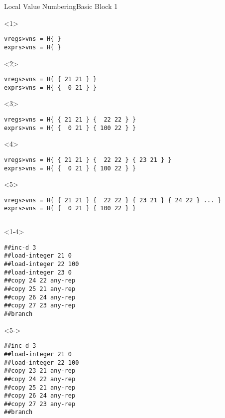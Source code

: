 \documentclass{beamer}
\begin{document}
\begin{frame}[fragile]{Local Value Numbering}{Basic Block 1}
  \begin{onlyenv}<1>
  \begin{Verbatim}
vregs>vns = H{ }
exprs>vns = H{ }
  \end{Verbatim}
  \end{onlyenv}
  \begin{onlyenv}<2>
  \begin{Verbatim}
vregs>vns = H{ { 21 21 } }
exprs>vns = H{ {  0 21 } }
  \end{Verbatim}
  \end{onlyenv}
  \begin{onlyenv}<3>
  \begin{Verbatim}
vregs>vns = H{ { 21 21 } {  22 22 } }
exprs>vns = H{ {  0 21 } { 100 22 } }
  \end{Verbatim}
  \end{onlyenv}
  \begin{onlyenv}<4>
  \begin{Verbatim}
vregs>vns = H{ { 21 21 } {  22 22 } { 23 21 } }
exprs>vns = H{ {  0 21 } { 100 22 } }
  \end{Verbatim}
  \end{onlyenv}
  \begin{onlyenv}<5>
  \begin{Verbatim}
vregs>vns = H{ { 21 21 } {  22 22 } { 23 21 } { 24 22 } ... }
exprs>vns = H{ {  0 21 } { 100 22 } }
  \end{Verbatim}
  \end{onlyenv}
  \begin{columns}[t,onlytextwidth]
    \begin{column}[t]{.45\textwidth}
      \begin{onlyenv}<1-4>
      \begin{Verbatim}[frame=single]
##inc-d 3
##load-integer 21 0
##load-integer 22 100
##load-integer 23 0
##copy 24 22 any-rep
##copy 25 21 any-rep
##copy 26 24 any-rep
##copy 27 23 any-rep
##branch
      \end{Verbatim}
      \end{onlyenv}
      \begin{onlyenv}<5->
      \begin{Verbatim}[frame=single]
##inc-d 3
##load-integer 21 0
##load-integer 22 100
##copy 23 21 any-rep
##copy 24 22 any-rep
##copy 25 21 any-rep
##copy 26 24 any-rep
##copy 27 23 any-rep
##branch
      \end{Verbatim}
      \end{onlyenv}
    \end{column}


\end{columns}
\end{frame}
\end{document}
